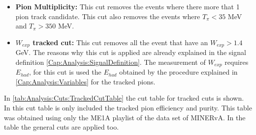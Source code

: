 \begin{itemize}
    
    \item \textbf{Pion Multiplicity:} This cut removes the events where there more that 1 pion track candidate. This cut also removes the events where $T_\pi < 35$ MeV and $T_\pi > 350$ MeV. 
    \item \textbf{$W_{exp}$ tracked cut:} This cut removes all the event that have an $W_{exp} > 1.4$ GeV. The reasons why this cut is applied are already explained in the signal definition \ref{Cap:Analysis:SignalDefinition}. The measurement of $W_{exp}$ requires $E_{had}$, for this cut is used the $E_{had}$ obtained by the procedure explained in \ref{Cap:Analysis:Variables} for the tracked pions. 
    
\end{itemize}

In \ref{tab:Analysis:Cuts:TrackedCutTable} the cut table for tracked cuts is shown. In this cut table is only included the tracked pion efficiency and purity. This table was obtained using only the ME1A playlist of the data set of MINERvA. In the table the general cuts are applied too. 

